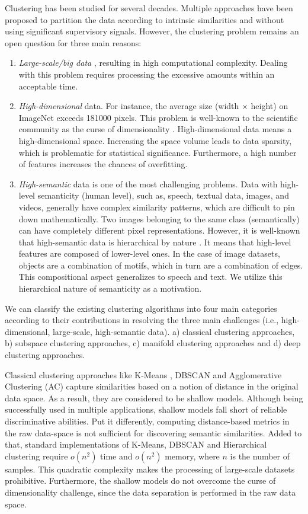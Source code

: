 \documentclass{article}
\begin{document}
Clustering has been studied for several decades. Multiple approaches have been proposed to partition the data according to intrinsic similarities and without using significant supervisory signals. However, the clustering problem remains an open question for three main reasons:
\begin{enumerate}
  \item \textit{Large-scale/big data} \cite{paper57}, resulting in high computational complexity. Dealing with this problem requires processing the excessive amounts within an acceptable time. 
  \item \textit{High-dimensional} data. For instance, the average size (width $\times$ height) on ImageNet \cite{paper82} exceeds 181000 pixels. This problem is well-known to the scientific community as the curse of dimensionality \cite{paper56}. High-dimensional data means a high-dimensional space. Increasing the space volume leads to data sparsity, which is problematic for statistical significance. Furthermore, a high number of features increases the chances of overfitting.
  \item  \textit{High-semantic} data is one of the most challenging problems. Data with high-level semanticity (human level), such as, speech, textual data, images, and videos, generally have complex similarity patterns, which are difficult to pin down mathematically. Two images belonging to the same class (semantically) can have completely different pixel representations. However, it is well-known that high-semantic data is hierarchical by nature \cite{paper20}. It means that high-level features are composed of lower-level ones. In the case of image datasets, objects are a combination of motifs, which in turn are a combination of edges. This compositional aspect generalizes to speech and text. We utilize this hierarchical nature of semanticity as a motivation. 
\end{enumerate}

We can classify the existing clustering algorithms into four main categories according to their contributions in resolving the three main challenges (i.e., high-dimensional, large-scale, high-semantic data). a) classical clustering  approaches, b) subspace clustering approaches, c) manifold clustering approaches and d) deep clustering approaches.

Classical clustering approaches like K-Means \cite{paper14}, DBSCAN \cite{paper83} and Agglomerative Clustering (AC) \cite{paper84} capture similarities based on a notion of distance in the original data space. As a result, they are considered to be shallow models. Although being successfully used in multiple applications, shallow models fall short of reliable discriminative abilities. Put it differently, computing distance-based metrics in the raw data-space is not sufficient for discovering semantic similarities. Added to that, standard implementations of K-Means, DBSCAN and Hierarchical clustering require $o(n^{2})$ time and $o(n^{2})$ memory, where $n$ is the number of samples. This quadratic complexity makes the processing of large-scale datasets prohibitive. Furthermore, the shallow models do not overcome the curse of dimensionality challenge, since the data separation is performed in the raw data space.
\end{document}
